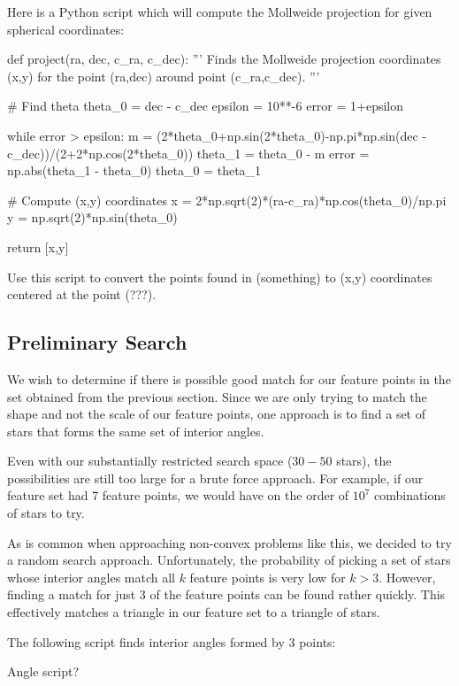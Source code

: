 \documentclass[paper=a4, fontsize=11pt]{scrartcl} %
\begin{document}
Here is a Python script which will compute the Mollweide projection for given spherical coordinates:
\begin{python}

def project(ra, dec, c_ra, c_dec):
	'''
	Finds the Mollweide projection coordinates (x,y) for the point (ra,dec) around 
	point (c_ra,c_dec).
	'''
	
	# Find theta
	theta_0 = dec - c_dec
	epsilon = 10**-6
	error = 1+epsilon
	
	while error > epsilon:
	    m = (2*theta_0+np.sin(2*theta_0)-np.pi*np.sin(dec - c_dec))/(2+2*np.cos(2*theta_0))
	    theta_1 = theta_0 - m
	    error = np.abs(theta_1 - theta_0)
	    theta_0 = theta_1
	
	# Compute (x,y) coordinates
	x = 2*np.sqrt(2)*(ra-c_ra)*np.cos(theta_0)/np.pi
	y = np.sqrt(2)*np.sin(theta_0)
	
	return [x,y]
\end{python}

Use this script to convert the points found in (something) to (x,y) coordinates centered at the point (???).

\subsection{Preliminary Search}
We wish to determine if there is possible good match for our feature points in the set obtained from the previous section.  Since we are only trying to match the shape and not the scale of our feature points, one approach is to find a set of stars that forms the same set of interior angles.

Even with our substantially restricted search space ($30-50$ stars), the possibilities are still too large for a brute force approach.  For example, if our feature set had 7 feature points, we would have on the order of $10^7$ combinations of stars to try.

As is common when approaching non-convex problems like this, we decided to try a random search approach. Unfortunately, the probability of picking a set of stars whose interior angles match all $k$ feature points is very low for $k>3$. However, finding a match for just $3$ of the feature points can be found rather quickly. This effectively matches a triangle in our feature set to a triangle of stars.



The following script finds interior angles formed by $3$ points:

\begin{python}
Angle script?
\end{python}
\end{document}
